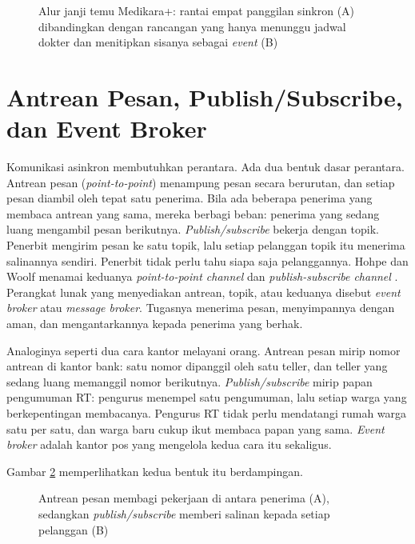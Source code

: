 \begin{figure}[!htb]
  \centering
  
  \caption{Alur janji temu Medikara+: rantai empat panggilan sinkron (A) dibandingkan dengan
           rancangan yang hanya menunggu jadwal dokter dan menitipkan sisanya sebagai
           \textit{event} (B)}
  \label{fig:ch09-rantai-sinkron}
\end{figure}

\section{Antrean Pesan, Publish/Subscribe, dan Event Broker}
\label{sec:ch09-broker}

Komunikasi asinkron membutuhkan perantara. Ada dua bentuk dasar perantara. Antrean pesan
(\textit{point-to-point}) menampung pesan secara berurutan, dan setiap pesan diambil oleh tepat satu
penerima. Bila ada beberapa penerima yang membaca antrean yang sama, mereka berbagi beban: penerima
yang sedang luang mengambil pesan berikutnya. \textit{Publish/subscribe} bekerja dengan topik.
Penerbit mengirim pesan ke satu topik, lalu setiap pelanggan topik itu menerima salinannya sendiri.
Penerbit tidak perlu tahu siapa saja pelanggannya. Hohpe dan Woolf menamai keduanya
\textit{point-to-point channel} dan \textit{publish-subscribe channel} \cite{c09-hohpe2003}.
Perangkat lunak yang menyediakan antrean, topik, atau keduanya disebut \textit{event broker} atau
\textit{message broker}. Tugasnya menerima pesan, menyimpannya dengan aman, dan mengantarkannya
kepada penerima yang berhak.

Analoginya seperti dua cara kantor melayani orang. Antrean pesan mirip nomor antrean di kantor bank:
satu nomor dipanggil oleh satu teller, dan teller yang sedang luang memanggil nomor berikutnya.
\textit{Publish/subscribe} mirip papan pengumuman RT: pengurus menempel satu pengumuman, lalu setiap
warga yang berkepentingan membacanya. Pengurus RT tidak perlu mendatangi rumah warga satu per satu,
dan warga baru cukup ikut membaca papan yang sama. \textit{Event broker} adalah kantor pos yang
mengelola kedua cara itu sekaligus.

Gambar \ref{fig:ch09-antrean-pubsub} memperlihatkan kedua bentuk itu berdampingan.

\begin{figure}[!htb]
  \centering
  
  \caption{Antrean pesan membagi pekerjaan di antara penerima (A), sedangkan
           \textit{publish/subscribe} memberi salinan kepada setiap pelanggan (B)}
  \label{fig:ch09-antrean-pubsub}
\end{figure}

